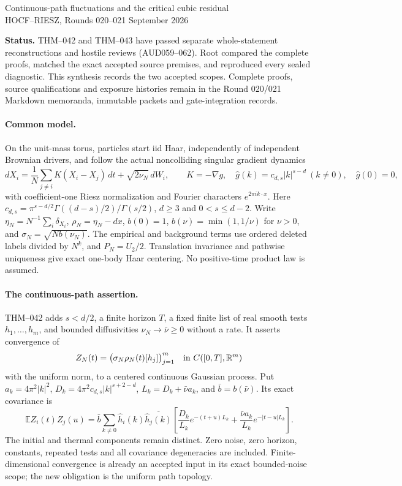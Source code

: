 \documentclass[10pt]{article}
\newcommand{\E}{\mathbb E}
\newcommand{\R}{\mathbb R}
\begin{document}
\begin{center}
{\Large Continuous-path fluctuations and the critical cubic residual}\\[4pt]
HOCF--RIESZ, Rounds 020--021  September 2026
\end{center}
\noindent\textbf{Status.} THM--042 and THM--043 have passed separate whole-statement reconstructions and hostile reviews (AUD059--062). Root compared the complete proofs, matched the exact accepted source premises, and reproduced every sealed diagnostic. This synthesis records the two accepted scopes. Complete proofs, source qualifications and exposure histories remain in the Round 020/021 Markdown memoranda, immutable packets and gate-integration records.

\paragraph{Common model.}
On the unit-mass torus, particles start iid Haar, independently of independent Brownian drivers, and follow the actual noncolliding singular gradient dynamics
\[
 dX_i=\frac1N\sum_{j\ne i}K(X_i-X_j)\,dt+\sqrt{2\nu_N}\,dW_i,
 \qquad K=-\nabla g,\quad
 \widehat g(k)=c_{d,s}|k|^{s-d}\ (k\ne0),\quad\widehat g(0)=0,
\]
with coefficient-one Riesz normalization and Fourier characters $e^{2\pi i k\cdot x}$.
Here $c_{d,s}=\pi^{s-d/2}\Gamma((d-s)/2)/\Gamma(s/2)$, $d\ge3$ and $0<s\le d-2$. Write
$\eta_N=N^{-1}\sum_i\delta_{X_i}$, $\rho_N=\eta_N-dx$,
$b(0)=1$, $b(\nu)=\min(1,1/\nu)$ for $\nu>0$, and $\sigma_N=\sqrt{Nb(\nu_N)}$.
The empirical and background terms use ordered deleted labels divided by $N^k$, and $P_N=U_2/2$. Translation invariance and pathwise uniqueness give exact one-body Haar centering. No positive-time product law is assumed.

\paragraph{The continuous-path assertion.}
THM--042 adds $s<d/2$, a finite horizon $T$, a fixed finite list of real smooth tests $h_1,\ldots,h_m$, and bounded diffusivities $\nu_N\to\bar\nu\ge0$ without a rate. It asserts convergence of
\[
 Z_N(t)=\bigl(\sigma_N\rho_N(t)[h_j]\bigr)_{j=1}^m
 \quad\hbox{in }C([0,T],\R^m)
\]
with the uniform norm, to a centered continuous Gaussian process. Put
$a_k=4\pi^2|k|^2$, $D_k=4\pi^2c_{d,s}|k|^{s+2-d}$, $L_k=D_k+\bar\nu a_k$, and $\bar b=b(\bar\nu)$. Its exact covariance is
\[
 \E Z_i(t)Z_j(u)=\bar b\sum_{k\ne0}\widehat h_i(k)\overline{\widehat h_j(k)}
 \left[\frac{D_k}{L_k}e^{-(t+u)L_k}
       +\frac{\bar\nu a_k}{L_k}e^{-|t-u|L_k}\right].
\]
The initial and thermal components remain distinct. Zero noise, zero horizon, constants, repeated tests and all covariance degeneracies are included. Finite-dimensional convergence is already an accepted input in its exact bounded-noise scope; the new obligation is the uniform path topology.
\end{document}
